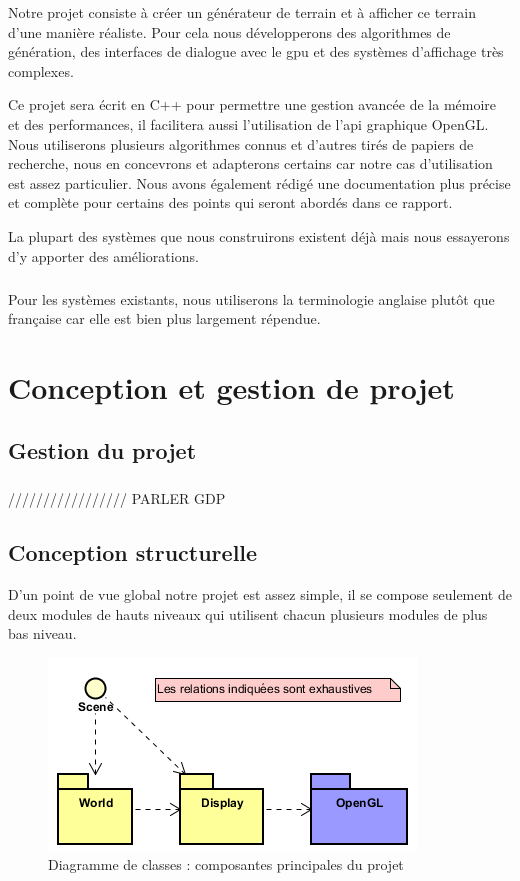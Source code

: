 \documentclass{EPUProjetDi}
\begin{document}
Notre projet consiste à créer un générateur de terrain et à afficher ce terrain d'une manière réaliste. Pour cela nous développerons des algorithmes de génération, des interfaces de dialogue avec le gpu et des systèmes d'affichage très complexes.

Ce projet sera écrit en C++ pour permettre une gestion avancée de la mémoire et des performances, il facilitera aussi l'utilisation de l'api graphique OpenGL.
Nous utiliserons plusieurs algorithmes connus et d'autres tirés de papiers de recherche, nous en concevrons et adapterons certains car notre cas d'utilisation est assez particulier.
Nous avons également rédigé une documentation plus précise et complète pour certains des points qui seront abordés dans ce rapport.  %

La plupart des systèmes que nous construirons existent déjà mais nous essayerons d'y apporter des améliorations.

\paragraph{}
Pour les systèmes existants, nous utiliserons la terminologie anglaise plutôt que française car elle est bien plus largement répendue.

\chapter{Conception et gestion de projet}

\section{Gestion du projet}

\paragraph{}

///////////////// PARLER GDP


\section{Conception structurelle}

D'un point de vue global notre projet est assez simple, il se compose seulement de deux modules de hauts niveaux qui utilisent chacun plusieurs modules de plus bas niveau.

\begin{figure}[ht]
	\centering
	\includegraphics[scale=.6]{overview_uml}
	\caption{Diagramme de classes : composantes principales du projet}
\end{figure}
\end{document}
